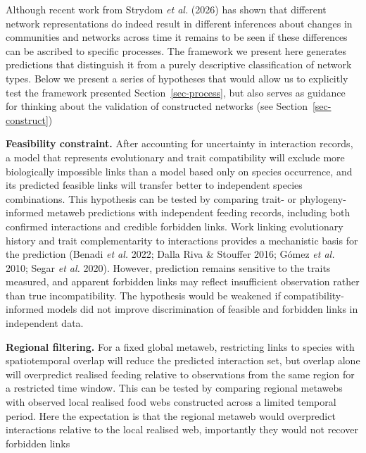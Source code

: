 \documentclass[
]{article}
\begin{document}
\begin{tcolorbox}[enhanced jigsaw, arc=.35mm, bottomrule=.15mm, bottomtitle=1mm, breakable, colback=white, colbacktitle=quarto-callout-note-color!10!white, colframe=quarto-callout-note-color-frame, coltitle=black, left=2mm, leftrule=.75mm, opacityback=0, opacitybacktitle=0.6, rightrule=.15mm, title=\textcolor{quarto-callout-note-color}{\faInfo}\hspace{0.5em}{Testing the transition from feasible to realised food webs}, titlerule=0mm, toprule=.15mm, toptitle=1mm]

Although recent work from Strydom \emph{et al.} (2026) has shown that
different network representations do indeed result in different
inferences about changes in communities and networks across time it
remains to be seen if these differences can be ascribed to specific
processes. The framework we present here generates predictions that
distinguish it from a purely descriptive classification of network
types. Below we present a series of hypotheses that would allow us to
explicitly test the framework presented Section~\ref{sec-process}, but
also serves as guidance for thinking about the validation of constructed
networks (see Section~\ref{sec-construct})

\textbf{Feasibility constraint.} After accounting for uncertainty in
interaction records, a model that represents evolutionary and trait
compatibility will exclude more biologically impossible links than a
model based only on species occurrence, and its predicted feasible links
will transfer better to independent species combinations. This
hypothesis can be tested by comparing trait- or phylogeny-informed
metaweb predictions with independent feeding records, including both
confirmed interactions and credible forbidden links. Work linking
evolutionary history and trait complementarity to interactions provides
a mechanistic basis for the prediction (Benadi \emph{et al.} 2022; Dalla
Riva \& Stouffer 2016; Gómez \emph{et al.} 2010; Segar \emph{et al.}
2020). However, prediction remains sensitive to the traits measured, and
apparent forbidden links may reflect insufficient observation rather
than true incompatibility. The hypothesis would be weakened if
compatibility-informed models did not improve discrimination of feasible
and forbidden links in independent data.

\textbf{Regional filtering.} For a fixed global metaweb, restricting
links to species with spatiotemporal overlap will reduce the predicted
interaction set, but overlap alone will overpredict realised feeding
relative to observations from the same region for a restricted time
window. This can be tested by comparing regional metawebs with observed
local realised food webs constructed across a limited temporal period.
Here the expectation is that the regional metaweb would overpredict
interactions relative to the local realised web, importantly they would
not recover forbidden links


\end{tcolorbox}
\end{document}
